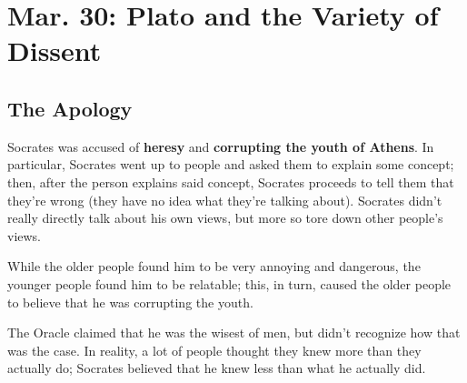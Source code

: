 \documentclass[letterpaper]{article}
\begin{document}
\section{Mar. 30: Plato and the Variety of Dissent}

\subsection{The Apology}
Socrates was accused of \textbf{heresy} and \textbf{corrupting the youth of Athens}. In particular, Socrates went up to people and asked them to explain some concept; then, after the person explains said concept, Socrates proceeds to tell them that they're wrong (they have no idea what they're talking about). Socrates didn't really directly talk about his own views, but more so tore down other people's views. 

\bigskip 

While the older people found him to be very annoying and dangerous, the younger people found him to be relatable; this, in turn, caused the older people to believe that he was corrupting the youth. 

\bigskip 

The Oracle claimed that he was the wisest of men, but didn't recognize how that was the case. In reality, a lot of people thought they knew more than they actually do; Socrates believed that he knew less than what he actually did. 
\end{document}
